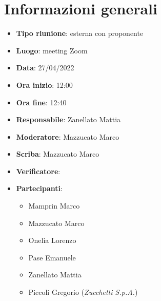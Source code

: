 \section{Informazioni generali}
\begin{itemize}
  \item \textbf{Tipo riunione}: esterna con proponente
  \item \textbf{Luogo}: meeting Zoom
  \item \textbf{Data}: 27/04/2022
  \item \textbf{Ora inizio}: 12:00
  \item \textbf{Ora fine}: 12:40
  \item \textbf{Responsabile}: Zanellato Mattia
  \item \textbf{Moderatore}: Mazzucato Marco
  \item \textbf{Scriba}: Mazzucato Marco
  \item \textbf{Verificatore}:
  \item \textbf{Partecipanti}:
  \begin{itemize}
    \item Mamprin Marco
    \item Mazzucato Marco
    \item Onelia Lorenzo
    \item Pase Emanuele
    \item Zanellato Mattia
    \item Piccoli Gregorio (\textit{Zucchetti S.p.A.})
  \end{itemize}
\end{itemize}
